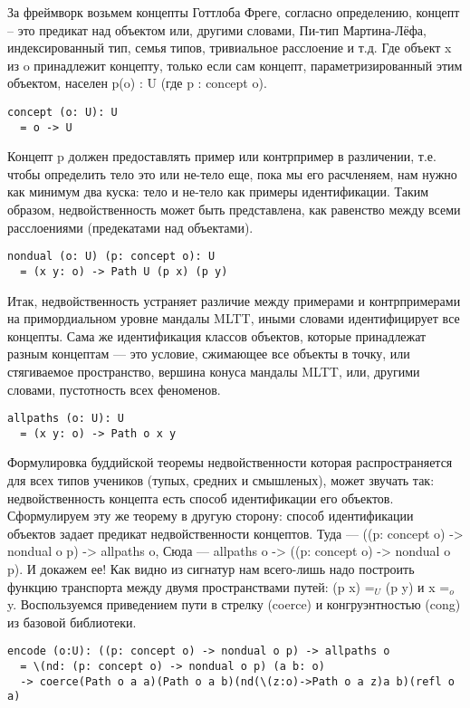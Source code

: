 За фреймворк возьмем концепты Готтлоба Фреге, согласно определению,
концепт -- это предикат над объектом или, другими словами, Пи-тип
Мартина-Лёфа, индексированный тип, семья типов, тривиальное
расслоение и т.д. Где объект x из o принадлежит концепту,
только если сам концепт, параметризированный этим объектом,
населен p(o) : U (где p : concept o).

\begin{lstlisting}
concept (o: U): U
  = o -> U
\end{lstlisting}

Концепт p должен предоставлять пример или контрпример в различении,
т.е. чтобы определить тело это или не-тело еще, пока мы его расчленяем,
нам нужно как минимум два куска: тело и не-тело как примеры идентификации.
Таким образом, недвойственность может быть представлена, как равенство
между всеми расслоениями (предекатами над объектами).

\begin{lstlisting}
nondual (o: U) (p: concept o): U
  = (x y: o) -> Path U (p x) (p y)
\end{lstlisting}

Итак, недвойственность устраняет различие между примерами
и контрпримерами на примордиальном уровне мандалы MLTT,
иными словами идентифицирует все концепты. Сама же идентификация
классов объектов, которые принадлежат разным концептам — это условие,
сжимающее все объекты в точку, или стягиваемое пространство,
вершина конуса мандалы MLTT, или, другими словами,
пустотность всех феноменов.

\begin{lstlisting}
allpaths (o: U): U
  = (x y: o) -> Path o x y
\end{lstlisting}

Формулировка буддийской теоремы недвойственности которая
распространяется для всех типов учеников (тупых, средних и смышленых),
может звучать так: недвойственность концепта есть способ идентификации
его объектов. Сформулируем эту же теорему в другую сторону:
способ идентификации объектов задает предикат недвойственности
концептов. Туда — ((p: concept o) -> nondual o p) -> allpaths o,
Сюда — allpaths o -> ((p: concept o) -> nondual o p).
И докажем ее! Как видно из сигнатур нам всего-лишь надо
построить функцию транспорта между двумя пространствами
путей: (p x) =$_U$ (p y) и x =$_o$ y. Воспользуемся приведением
пути в стрелку (coerce) и конгруэнтностью (cong) из базовой библиотеки.

\begin{lstlisting}
encode (o:U): ((p: concept o) -> nondual o p) -> allpaths o
  = \(nd: (p: concept o) -> nondual o p) (a b: o)
  -> coerce(Path o a a)(Path o a b)(nd(\(z:o)->Path o a z)a b)(refl o a)
\end{lstlisting}

